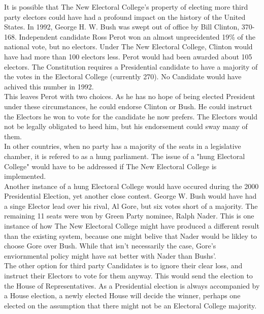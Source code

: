 \documentclass{article}
\begin{document}
    It is possible that The New Electoral College's property of electing more third party electors could have had a profound impact on the history of the United States. In 1992, George H. W. Bush was swept out of office by Bill Clinton, 370-168. Independent candidate Ross Perot won an almost unprecidented 19\% of the national vote, but no electors. Under The New Electoral College, Clinton would have had more than 100 electors less. Perot would had been awarded about 105 electors. The Constitution requires a Presidential candidate to have a majority of the votes in the Electoral College (currently 270). No Candidate would have achived this number in 1992.\\
    
    This leaves Perot with two choices. As he has no hope of being elected President under these circumstances, he could endorse Clinton or Bush. He could instruct the Electors he won to vote for the candidate he now prefers. The Electors would not be legally obligated to heed him, but his endorsement could sway many of them.\\
    
    In other countries, when no party has a majority of the seats in a legislative chamber, it is refered to as a hung parliament. The issue of a "hung Electoral College" would have to be addressed if The New Electoral College is implemented.\\
    
    Another instance of a hung Electoral College would have occured during the 2000 Presidential Election, yet another close contest. George W. Bush would have had a singe Elector lead over his rival, Al Gore, but six votes short of a majority. The remaining 11 seats were won by Green Party nominee, Ralph Nader. This is one instance of how The New Electoral College might have produced a different result than the existing system, because one might belive that Nader would be likley to choose Gore over Bush. While that isn't necessarily the case, Gore's enviornmental policy might have sat better with Nader than Bushs'.\\

    The other option for third party Candidates is to ignore their clear loss, and instruct their Electors to vote for them anyway. This would send the election to the House of Representatives. As a Presidential election is always accompanied by a House election, a newly elected House will decide the winner, perhaps one elected on the assumption that there might not be an Electoral College majority.\\
\end{document}
